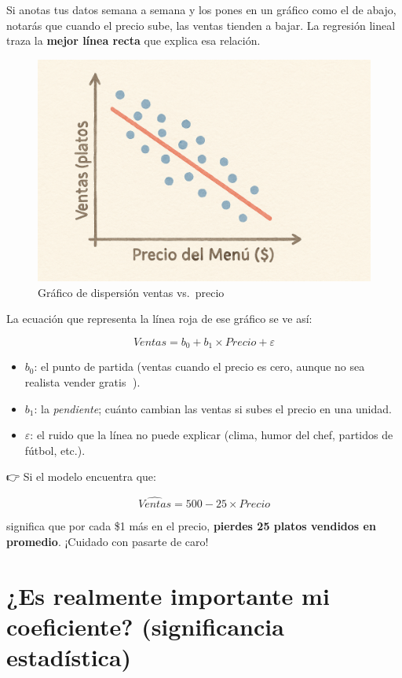 \documentclass[
  spanish,
  letterpaper,
  DIV=11,
  numbers=noendperiod]{scrreprt}
\providecommand{\tightlist}{%
  \setlength{\itemsep}{0pt}\setlength{\parskip}{0pt}}
\begin{document}
Si anotas tus datos semana a semana y los pones en un gráfico como el de
abajo, notarás que cuando el precio sube, las ventas tienden a bajar. La
regresión lineal traza la \textbf{mejor línea recta} que explica esa
relación.

\begin{figure}[H]

{\centering \includegraphics[width=0.6\linewidth,height=\textheight,keepaspectratio]{img/reg_2.png}

}

\caption{Gráfico de dispersión ventas vs.~precio}

\end{figure}%

La ecuación que representa la línea roja de ese gráfico se ve así:

\[
Ventas = b_0 + b_1 \times Precio + \varepsilon
\]

\begin{itemize}
\tightlist
\item
  \textbf{\(b_0\)}: el punto de partida (ventas cuando el precio es
  cero, aunque no sea realista vender gratis 🍕).\\
\item
  \textbf{\(b_1\)}: la \emph{pendiente}; cuánto cambian las ventas si
  subes el precio en una unidad.\\
\item
  \textbf{\(\varepsilon\)}: el ruido que la línea no puede explicar
  (clima, humor del chef, partidos de fútbol, etc.).
\end{itemize}

👉 Si el modelo encuentra que:

\[
\hat{Ventas} = 500 - 25 \times Precio
\]

significa que por cada \$1 más en el precio, \textbf{pierdes 25 platos
vendidos en promedio}. ¡Cuidado con pasarte de caro!

\section{¿Es realmente importante mi coeficiente? (significancia
estadística)}\label{es-realmente-importante-mi-coeficiente-significancia-estaduxedstica}
\end{document}
